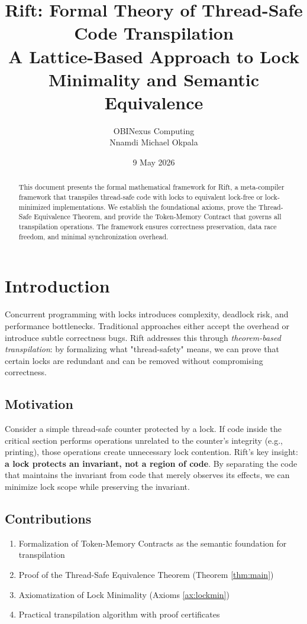 \documentclass[11pt]{article}
\title{Rift: Formal Theory of Thread-Safe Code Transpilation \\
\large A Lattice-Based Approach to Lock Minimality and Semantic Equivalence}
\author{OBINexus Computing \\ Nnamdi Michael Okpala}
\date{9 May 2026}
\begin{document}
\maketitle

\begin{abstract}
This document presents the formal mathematical framework for Rift, a meta-compiler framework that transpiles thread-safe code with locks to equivalent lock-free or lock-minimized implementations. We establish the foundational axioms, prove the Thread-Safe Equivalence Theorem, and provide the Token-Memory Contract that governs all transpilation operations. The framework ensures correctness preservation, data race freedom, and minimal synchronization overhead.
\end{abstract}

\section{Introduction}

Concurrent programming with locks introduces complexity, deadlock risk, and performance bottlenecks. Traditional approaches either accept the overhead or introduce subtle correctness bugs. Rift addresses this through \textit{theorem-based transpilation}: by formalizing what "thread-safety" means, we can prove that certain locks are redundant and can be removed without compromising correctness.

\subsection{Motivation}

Consider a simple thread-safe counter protected by a lock. If code inside the critical section performs operations unrelated to the counter's integrity (e.g., printing), those operations create unnecessary lock contention. Rift's key insight: \textbf{a lock protects an invariant, not a region of code}. By separating the code that maintains the invariant from code that merely observes its effects, we can minimize lock scope while preserving the invariant.

\subsection{Contributions}

\begin{enumerate}
    \item Formalization of Token-Memory Contracts as the semantic foundation for transpilation
    \item Proof of the Thread-Safe Equivalence Theorem (Theorem \ref{thm:main})
    \item Axiomatization of Lock Minimality (Axioms \ref{ax:lockmin})
    \item Practical transpilation algorithm with proof certificates
\end{enumerate}
\end{document}
